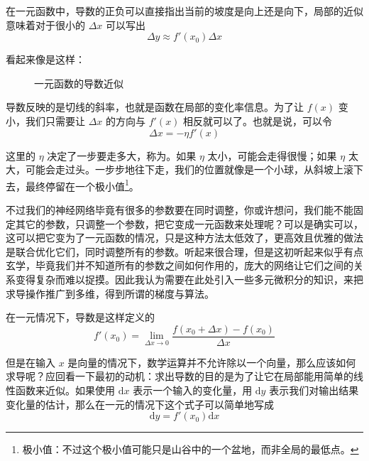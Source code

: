 在一元函数中，导数的正负可以直接指出当前的坡度是向上还是向下，局部的近似意味着对于很小的 $\Delta x$ 可以写出
\[
    \Delta y \approx f'(x_0)\Delta x
\]

看起来像是这样：
\begin{figure}[H]
\centering
{}
\caption{一元函数的导数近似}
\end{figure}

导数反映的是切线的斜率，也就是函数在局部的变化率信息。为了让 $f(x)$ 变小，我们只需要让 $\Delta x$ 的方向与 $f'(x)$ 相反就可以了。也就是说，可以令
\[
    \Delta x = -\eta f'(x)
\]

这里的 $\eta$ 决定了一步要走多大，称为。如果 $\eta$ 太小，可能会走得很慢；如果 $\eta$ 太大，可能会走过头。一步步地往下走，我们的位置就像是一个小球，从斜坡上滚下去，最终停留在一个极小值\footnote{极小值：不过这个极小值可能只是山谷中的一个盆地，而非全局的最低点。}。

不过我们的神经网络毕竟有很多的参数要在同时调整，你或许想问，我们能不能固定其它的参数，只调整一个参数，把它变成一元函数来处理呢？可以是确实可以，这可以把它变为了一元函数的情况，只是这种方法太低效了，更高效且优雅的做法是联合优化它们，同时调整所有的参数。听起来很合理，但是这初听起来似乎有点玄学，毕竟我们并不知道所有的参数之间如何作用的，庞大的网络让它们之间的关系变得复杂而难以捉摸。因此我认为需要在此处引入一些多元微积分的知识，来把求导操作推广到多维，得到所谓的梯度与算法。

在一元情况下，导数是这样定义的
\[
    f'(x_0) = \lim_{\Delta x\to 0} \frac{f(x_0 + \Delta x) - f(x_0)}{\Delta x}
\]

但是在输入 $x$ 是向量的情况下，数学运算并不允许除以一个向量，那么应该如何求导呢？应回看一下最初的动机：求出导数的目的是为了让它在局部能用简单的线性函数来近似。如果使用 $\mathrm{d}x$ 表示一个输入的变化量，用 $\mathrm{d}y$ 表示我们对输出结果变化量的估计，那么在一元的情况下这个式子可以简单地写成
\[
    \mathrm{d}y = f'(x_0) \mathrm{d}x
\]

